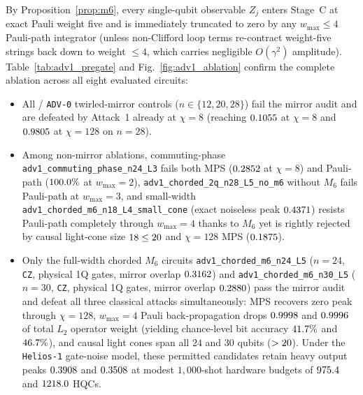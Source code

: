 \documentclass[aps,prapplied,reprint,longbibliography]{revtex4-2}
\begin{document}
By Proposition~\ref{prop:m6}, every single-qubit observable $Z_j$ enters Stage~C at exact Pauli weight five and is immediately truncated to zero by any $w_{\max} \le 4$ Pauli-path integrator (unless non-Clifford loop terms re-contract weight-five strings back down to weight $\le 4$, which carries negligible $O(\gamma^2)$ amplitude). Table~\ref{tab:adv1_pregate} and Fig.~\ref{fig:adv1_ablation} confirm the complete ablation across all eight evaluated circuits:
\begin{itemize}
\item All \AdvZeroRejected{}/\AdvZeroCount{} \texttt{ADV-0} twirled-mirror controls ($n \in \{12, 20, 28\}$) fail the mirror audit and are defeated by Attack~1 already at $\chi=8$ (reaching $0.1055{}$ at $\chi=8$ and $0.9805{}$ at $\chi=128$ on $n=28$).
\item Among non-mirror ablations, commuting-phase \texttt{adv1\_commuting\_phase\_n24\_L3} fails both MPS ($0.2852{}$ at $\chi=8$) and Pauli-path ($100.0{}\%$ at $w_{\max}=2$), \texttt{adv1\_chorded\_2q\_n28\_L5\_no\_m6} without $M_6$ fails Pauli-path at $w_{\max}=3$, and small-width \texttt{adv1\_chorded\_m6\_n18\_L4\_small\_cone} (exact noiseless peak $0.4371{}$) resists Pauli-path completely through $w_{\max}=4$ thanks to $M_6$ yet is rightly rejected by causal light-cone size $18 \le 20{}$ and $\chi=128$ MPS ($0.1875{}$).
\item Only the \AdvOnePermittedCount{} full-width chorded $M_6$ circuits \texttt{adv1\_chorded\_m6\_n24\_L5} ($n=24$, \AdvTwentyFourCz{} \texttt{CZ}, \AdvTwentyFourOneQ{} physical 1Q gates, mirror overlap $0.3162{}$) and \texttt{adv1\_chorded\_m6\_n30\_L5} ($n=30$, \AdvThirtyCz{} \texttt{CZ}, \AdvThirtyOneQ{} physical 1Q gates, mirror overlap $0.2880{}$) pass the mirror audit and defeat all three classical attacks simultaneously: MPS recovers zero peak through $\chi=128$, $w_{\max}=4$ Pauli back-propagation drops $0.9998{}$ and $0.9996{}$ of total $L_2$ operator weight (yielding chance-level bit accuracy $41.7{}\%$ and $46.7{}\%$), and causal light cones span all $24$ and $30$ qubits ($> 20{}$). Under the \texttt{Helios-1} gate-noise model, these \AdvOnePermittedCount{} permitted candidates retain heavy output peaks $0.3908{}$ and $0.3508{}$ at modest $1{,}000$-shot hardware budgets of $975.4{}$ and $1218.0{}$ HQCs.
\end{itemize}
\end{document}
